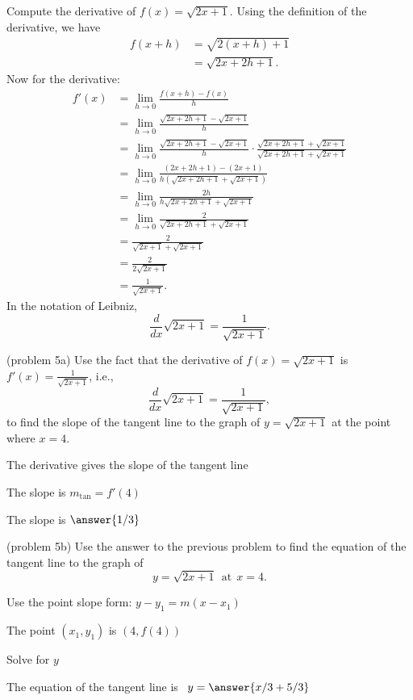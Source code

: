 \documentclass{ximera}
\begin{document}
\begin{example}[example 5]
Compute the derivative of  $f(x) = \sqrt{2x+1}$.
Using the definition of the derivative, we have
\begin{align*}
f(x+h) &= \sqrt{2(x+h)+1} \\
       &= \sqrt{2x +2h+1}.			
\end{align*}
Now for the derivative:
\begin{align*}
f'(x) &= \lim_{h \to 0} \frac{f(x+h)-f(x)}{h}\\[5pt]
&= \lim_{h \to 0} \frac{\sqrt{2x+2h+1}- \sqrt{2x+1}}{h}\\[5pt]
&= \lim_{h \to 0} \frac{\sqrt{2x+2h+1}- \sqrt{2x+1}}{h} \cdot
\frac{\sqrt{2x+2h+1}+ \sqrt{2x+1}}{\sqrt{2x+2h+1}+ \sqrt{2x+1}} \\[5pt]
&= \lim_{h \to 0} \frac{(2x+2h+1) - (2x+1)}{h(\sqrt{2x+2h+1}+ \sqrt{2x+1})}\\[5pt]
&= \lim_{h \to 0} \frac{2h}{h\sqrt{2x+2h+1}+ \sqrt{2x+1}}\\[5pt]
&= \lim_{h \to 0} \frac{2}{\sqrt{2x+2h+1}+ \sqrt{2x+1}}\\[5pt]
&=  \frac{2}{\sqrt{2x+1}+ \sqrt{2x+1}}\\[5pt]
&=  \frac{2}{2\sqrt{2x+1}}\\[5pt]
&=  \displaystyle{\frac{1}{\sqrt{2x+1}}}.
\end{align*}
In the notation of Leibniz, 
\[
\frac{d}{dx}\sqrt{2x+1}= \frac{1}{\sqrt{2x+1}}.
\]

\end{example}





\begin{problem}(problem 5a)
Use the fact that the derivative of $f(x) = \sqrt{2x+1}$ is $f'(x) = \frac{1}{\sqrt{2x+1}}$,
i.e., 
\[
\frac{d}{dx}\sqrt{2x+1} = \frac{1}{\sqrt{2x+1}},
\]
to find the slope of the tangent line to the graph of 
$y = \sqrt{2x+1}$ at the point where $x = 4$.\\
\begin{hint}
The derivative gives the slope of the tangent line
\end{hint}
\begin{hint}
The slope is $m_{\text{tan}} = f'(4)$
\end{hint}
The slope is $\answer{1/3}$
\end{problem}





\begin{problem}(problem 5b)
Use the answer to the previous problem to find the equation of the tangent line to the graph of 
\[
y = \sqrt{2x+1} \ \ \text{at} \ \ x=4.
\]
\begin{hint}
Use the point slope form: $y-y_1 = m(x-x_1)$
\end{hint}
\begin{hint}
The point $(x_1,y_1)$ is $(4, f(4))$
\end{hint}
\begin{hint}
Solve for $y$
\end{hint}
The equation of the tangent line is \ $y = \answer{x/3 + 5/3}$
\end{problem}
\end{document}
